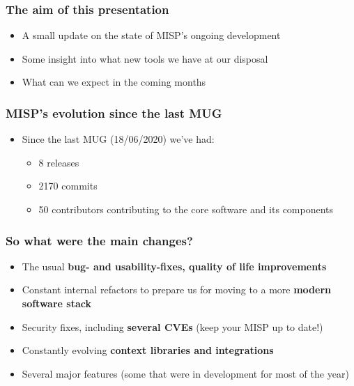 
\begin{frame}
\titlepage
\end{frame}

\begin{frame}
  \frametitle{The aim of this presentation}
  \begin{itemize}
     \item A small update on the state of MISP's ongoing development
     \item Some insight into what new tools we have at our disposal
     \item What can we expect in the coming months
  \end{itemize}
\end{frame}

\begin{frame}
  \frametitle{MISP's evolution since the last MUG}
  \begin{itemize}
    \item Since the last MUG (18/06/2020) we've had:
    \begin{itemize}
        \item 8 releases
        \item 2170 commits
        \item 50 contributors contributing to the core software and its components
    \end{itemize}
  \end{itemize}
\end{frame}

\begin{frame}
  \frametitle{So what were the main changes?}
  \begin{itemize}
     \item The usual {\bf bug- and usability-fixes, quality of life improvements}
     \item Constant internal refactors to prepare us for moving to a more {\bf modern software stack}
     \item Security fixes, including {\bf several CVEs} (keep your MISP up to date!)
     \item Constantly evolving {\bf context libraries and integrations}
     \item Several major features (some that were in development for most of the year)
  \end{itemize}
\end{frame}

